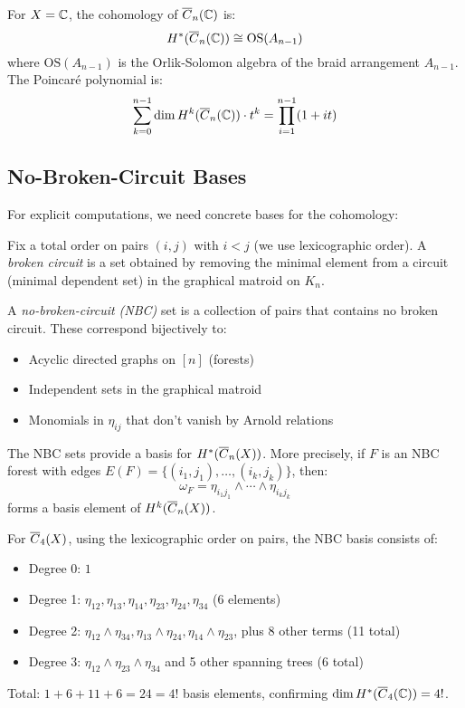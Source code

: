 \begin{theorem}
For $X = \mathbb{C}$, the cohomology of $\overline{C}_n(\mathbb{C})$ is:
\[
H^*(\overline{C}_n(\mathbb{C})) \cong \text{OS}(A_{n-1})
\]
where $\text{OS}(A_{n-1})$ is the Orlik-Solomon algebra of the braid arrangement $A_{n-1}$. The Poincaré polynomial is:
\[
\sum_{k=0}^{n-1} \dim H^k(\overline{C}_n(\mathbb{C})) \cdot t^k = \prod_{i=1}^{n-1}(1 + it)
\]
\end{theorem}
 
\subsection{No-Broken-Circuit Bases}
 
For explicit computations, we need concrete bases for the cohomology:
 
\begin{definition}
Fix a total order on pairs $(i, j)$ with $i < j$ (we use lexicographic order). A \emph{broken circuit} is a set obtained by removing the minimal element from a circuit (minimal dependent set) in the graphical matroid on $K_n$.
\end{definition}
 
\begin{definition}
A \emph{no-broken-circuit (NBC)} set is a collection of pairs that contains no broken circuit. These correspond bijectively to:
\begin{itemize}
\item Acyclic directed graphs on $[n]$ (forests)
\item Independent sets in the graphical matroid
\item Monomials in $\eta_{ij}$ that don't vanish by Arnold relations
\end{itemize}
\end{definition}
 
\begin{theorem}\label{thm:NBC}
The NBC sets provide a basis for $H^*(\overline{C}_n(X))$. More precisely, if $F$ is an NBC forest with edges $E(F) = \{(i_1, j_1), \ldots, (i_k, j_k)\}$, then:
\[
\omega_F = \eta_{i_1j_1} \wedge \cdots \wedge \eta_{i_kj_k}
\]
forms a basis element of $H^k(\overline{C}_n(X))$.
\end{theorem}
 
\begin{example}[NBC Basis for $n = 4$]\label{ex:NBC4}
For $\overline{C}_4(X)$, using the lexicographic order on pairs, the NBC basis consists of:
\begin{itemize}
\item Degree 0: $1$
\item Degree 1: $\eta_{12}, \eta_{13}, \eta_{14}, \eta_{23}, \eta_{24}, \eta_{34}$ (6 elements)
\item Degree 2: $\eta_{12} \wedge \eta_{34}, \eta_{13} \wedge \eta_{24}, \eta_{14} \wedge \eta_{23}$, plus 8 other terms (11 total)
\item Degree 3: $\eta_{12} \wedge \eta_{23} \wedge \eta_{34}$ and 5 other spanning trees (6 total)
\end{itemize}
Total: $1 + 6 + 11 + 6 = 24 = 4!$ basis elements, confirming $\dim H^*(\overline{C}_4(\mathbb{C})) = 4!$.
\end{example}
 
